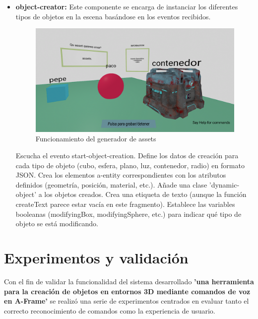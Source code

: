\documentclass[a4paper, 12pt]{book}
\begin{document}
\begin{itemize}
  \item \textbf{object-creator:} Este componente se encarga de instanciar los diferentes tipos de objetos en la escena basándose en los eventos recibidos.
  \begin{figure}[H]  %
    \centering
    \includegraphics[width=0.8\linewidth]{img/generador_funcional_completo_assets.png}  %
    \caption{Funcionamiento del generador de assets}  %
    \label{fig:generadorassets}  %
  \end{figure} 
  Escucha el evento start-object-creation.
  Define los datos de creación para cada tipo de objeto (cubo, esfera, plano, luz, contenedor, radio) en formato JSON.
  Crea los elementos a-entity correspondientes con los atributos definidos (geometría, posición, material, etc.).
  Añade una clase 'dynamic-object' a los objetos creados.
  Crea una etiqueta de texto (aunque la función createText parece estar vacía en este fragmento).
  Establece las variables booleanas (modifyingBox, modifyingSphere, etc.) para indicar qué tipo de objeto se está modificando.

\end{itemize}
\chapter{Experimentos y validación}
\label{chap:experimentos}

Con el fin de validar la funcionalidad del sistema desarrollado 
\textbf{'una herramienta para la creación de objetos en entornos 3D mediante comandos de voz en A-Frame'} se realizó una serie de experimentos centrados en evaluar tanto el correcto reconocimiento de comandos como la experiencia de usuario.
\end{document}
